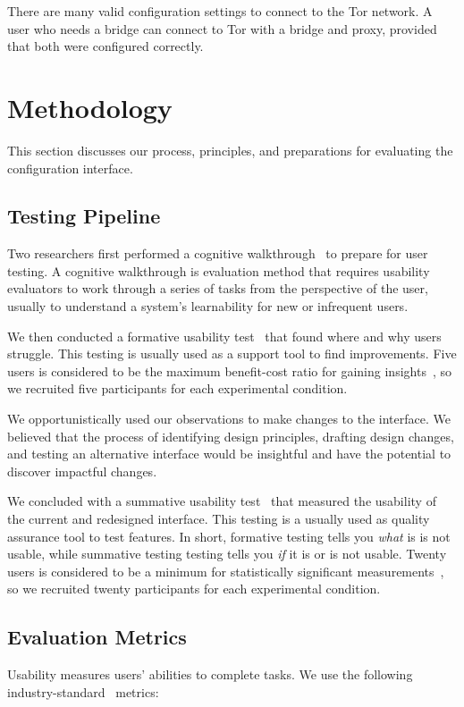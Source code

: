 \documentclass[USenglish,oneside,twocolumn]{article}
\begin{document}
There are many valid configuration settings to connect to the Tor network.
A user who needs a bridge can connect to Tor with a bridge and proxy, provided that both were configured correctly.

\section{Methodology} 
This section discusses our process, principles, and preparations for evaluating the configuration interface.

\subsection{Testing Pipeline} 
Two researchers first performed a cognitive walkthrough~\cite{cognitive-walkthrough} to prepare for user testing. A cognitive walkthrough is evaluation method that requires usability evaluators to work through a series of tasks from the perspective of the user, usually to understand a system's learnability for new or infrequent users.

We then conducted a formative usability test~\cite{formative} that found where and why users struggle. This testing is usually used as a support tool to find improvements. Five users is considered to be the maximum benefit-cost ratio for gaining insights~\cite{howmanyusers}, so we recruited five participants for each experimental condition. 

We opportunistically used our observations to make changes to the interface. We believed that the process of identifying design principles, drafting design changes, and testing an alternative interface would be insightful and have the potential to discover impactful changes.

We concluded with a summative usability test~\cite{summative} that measured the usability of the current and redesigned interface. This testing is a usually used as quality assurance tool to test features. In short, formative testing tells you {\it what} is is not usable, while summative testing testing tells you {\it if} it is or is not usable. Twenty users is considered to be a minimum for statistically significant measurements~\cite{howmanyusers}, so we recruited twenty participants for each experimental condition.  

\subsection{Evaluation Metrics}
\label{sec:eval}
Usability measures users' abilities to complete tasks. We use the following industry-standard~\cite{albert2013measuring} metrics: \\
\end{document}
